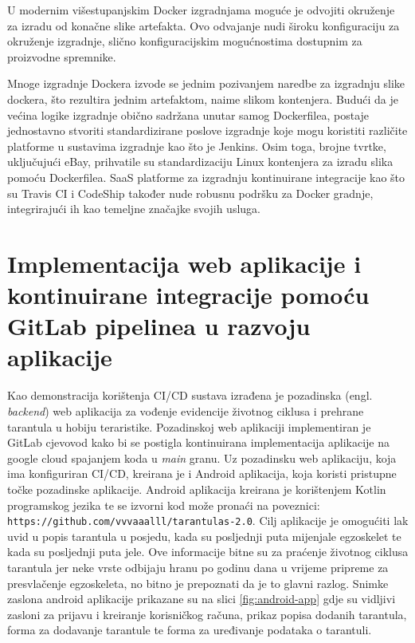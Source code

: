 \documentclass[a4paper,12pt,oneside]{article}
\begin{document}
U modernim višestupanjskim Docker izgradnjama moguće je odvojiti okruženje za izradu od konačne slike artefakta. Ovo odvajanje nudi široku konfiguraciju za okruženje izgradnje, slično konfiguracijskim mogućnostima dostupnim za proizvodne spremnike.

Mnoge izgradnje Dockera izvode se jednim pozivanjem naredbe za izgradnju slike dockera, što rezultira jednim artefaktom, naime slikom kontenjera. Budući da je većina logike izgradnje obično sadržana unutar samog Dockerfilea, postaje jednostavno stvoriti standardizirane poslove izgradnje koje mogu koristiti različite platforme u sustavima izgradnje kao što je Jenkins. Osim toga, brojne tvrtke, uključujući eBay, prihvatile su standardizaciju Linux kontenjera za izradu slika pomoću Dockerfilea. SaaS platforme za izgradnju kontinuirane integracije kao što su Travis CI i CodeShip također nude robusnu podršku za Docker gradnje, integrirajući ih kao temeljne značajke svojih usluga.

\newpage

\section{Implementacija web aplikacije i kontinuirane integracije pomoću GitLab pipelinea u razvoju aplikacije}

Kao demonstracija korištenja CI/CD sustava izrađena je pozadinska (engl. \textit{backend}) web aplikacija za vođenje evidencije životnog ciklusa i prehrane tarantula u hobiju teraristike. Pozadinskoj web aplikaciji implementiran je GitLab cjevovod kako bi se postigla kontinuirana implementacija aplikacije na google cloud spajanjem koda u \textit{main} granu. Uz pozadinsku web aplikaciju, koja ima konfiguriran CI/CD, kreirana je i Android aplikacija, koja koristi pristupne točke pozadinske aplikacije. Android aplikacija kreirana je korištenjem Kotlin programskog jezika te se izvorni kod može pronaći na poveznici: \texttt{https://github.com/vvvaaalll/tarantulas-2.0}.  Cilj aplikacije je omogućiti lak uvid u popis tarantula u posjedu, kada su posljednji puta mijenjale egzoskelet te kada su posljednji puta jele. Ove informacije bitne su za praćenje životnog ciklusa tarantula jer neke vrste odbijaju hranu po godinu dana u vrijeme pripreme za presvlačenje egzoskeleta, no bitno je prepoznati da je to glavni razlog. Snimke zaslona android aplikacije prikazane su na slici \ref{fig:android-app} gdje su vidljivi zasloni za prijavu i kreiranje korisničkog računa, prikaz popisa dodanih tarantula, forma za dodavanje tarantule te forma za uređivanje podataka o tarantuli.
\end{document}
